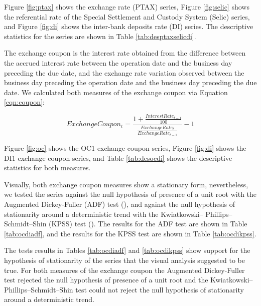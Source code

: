 \documentclass[cic,tc, english]{iiufrgs}
\begin{document}
    Figure \ref{fig:ptax} shows the exchange rate (PTAX) series, Figure \ref{fig:selic} shows the referential rate of the Special Settlement and Custody System (Selic) series, and Figure \ref{fig:di} shows the inter-bank deposits rate (DI) series. The descriptive statistics for the series are shown in Table \ref{tab:desptaxselicdi}.

    

    

    

    

    The exchange coupon is the interest rate obtained from the difference between the accrued interest rate between the operation date and the business day preceding the due date, and the exchange rate variation observed between the business day preceding the operation date and the business day preceding the due date. We calculated both measures of the exchange coupon via Equation \ref{eqn:coupon}:

    \begin{equation}
        \label{eqn:coupon}
        ExchangeCoupon_t = \frac{1 + \frac{InterestRate_{t-1}}{100}}{\frac{ExchangeRate_t}{ExchangeRate_{t-1}}} - 1
    \end{equation}

    Figure \ref{fig:oc} shows the OC1 exchange coupon series, Figure \ref{fig:di} shows the DI1 exchange coupon series, and Table \ref{tab:desocdi} shows the descriptive statistics for both measures.

    

    

    

    Visually, both exchange coupon measures show a stationary form, nevertheless, we tested the series against the null hypothesis of presence of a unit root with the Augmented Dickey-Fuller (ADF) test (\citet{adf}), and against the null hypothesis of stationarity around a deterministic trend with the Kwiatkowski– Phillips–Schmidt–Shin (KPSS) test (\citet{kpss}). The results for the ADF test are shown in Table \ref{tab:ocdiadf}, and the results for the KPSS test are shown in Table \ref{tab:ocdikpss}.

    

    

    The tests results in Tables \ref{tab:ocdiadf} and \ref{tab:ocdikpss} show support for the hypothesis of stationarity of the series that the visual analysis suggested to be true. For both measures of the exchange coupon the Augmented Dickey-Fuller test rejected the null hypothesis of presence of a unit root and the Kwiatkowski– Phillips–Schmidt–Shin test could not reject the null hypothesis of stationarity around a deterministic trend.
    
\end{document}
